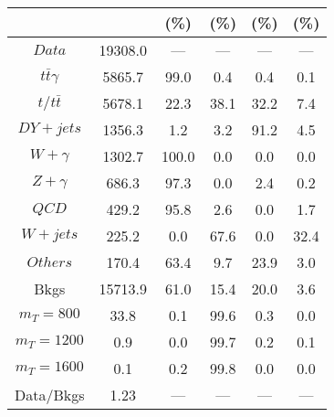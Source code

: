 \begin{figure}
\begin{minipage}[c]{0.32\textwidth}
{\begin{tabular}{cccccc}
 &  & (\%) & (\%) & (\%) & (\%)  \\
\hline
                                                                      $ Data $ &  19308.0 &  --- &  --- &  --- &  ---\\
$ t\bar{t}\gamma $ &  5865.7 &  99.0 &  0.4 &  0.4 &  0.1\\
$ t/t\bar{t} $ &  5678.1 &  22.3 &  38.1 &  32.2 &  7.4\\
$ DY+jets $ &  1356.3 &  1.2 &  3.2 &  91.2 &  4.5\\
$ W+\gamma $ &  1302.7 &  100.0 &  0.0 &  0.0 &  0.0\\
$ Z+\gamma $ &  686.3 &  97.3 &  0.0 &  2.4 &  0.2\\
$ QCD $ &  429.2 &  95.8 &  2.6 &  0.0 &  1.7\\
$ W+jets $ &  225.2 &  0.0 &  67.6 &  0.0 &  32.4\\
$ Others $ &  170.4 &  63.4 &  9.7 &  23.9 &  3.0\\
Bkgs &  15713.9 &  61.0 &  15.4 &  20.0 &  3.6\\
$ m_{T} = 800 $ &  33.8 &  0.1 &  99.6 &  0.3 &  0.0\\
$ m_{T} = 1200 $ &  0.9 &  0.0 &  99.7 &  0.2 &  0.1\\
$ m_{T} = 1600 $ &  0.1 &  0.2 &  99.8 &  0.0 &  0.0\\
Data/Bkgs &  1.23 &  --- &  --- &  --- &  ---\\
\hline
\end{tabular}
}
\end{minipage}
\end{figure}

